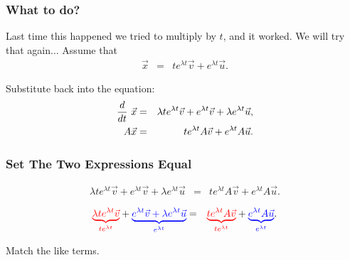 \begin{frame}
  \frametitle{What to do?}

  Last time this happened we tried to multiply by $t$, and it
  worked. We will try that again...
  Assume that
  \begin{eqnarray*}
    \vec{x} & = & t e^{\lambda t} \vec{v} + e^{\lambda t} \vec{u}.
  \end{eqnarray*}

  {
    Substitute back into the equation:
    \begin{eqnarray*}
      \deriv{~}{t} \vec{x} & = & \lambda t e^{\lambda t} \vec{v} + e^{\lambda t} \vec{v} 
         + \lambda e^{\lambda t} \vec{u}, \\
      A\vec{x} & = & t e^{\lambda t} A \vec{v} + e^{\lambda t} A \vec{u}.
    \end{eqnarray*}
  }
  
\end{frame}


\begin{frame}
  \frametitle{Set The Two Expressions Equal}

  {
    \begin{eqnarray*}
      \lambda t e^{\lambda t} \vec{v} + e^{\lambda t} \vec{v} + \lambda e^{\lambda t} \vec{u}
      & = & 
      t e^{\lambda t} A \vec{v} + e^{\lambda t} A \vec{u}.
    \end{eqnarray*}
  }

  {
    \begin{eqnarray*}
      \redText{\underbrace{\lambda t e^{\lambda t} \vec{v}}_ {te^{\lambda t}}} +  
      \blueText{\underbrace{e^{\lambda t} \vec{v} + \lambda e^{\lambda t} \vec{u}}_{e^{\lambda t}}}
      & = & 
      \redText{\underbrace{t e^{\lambda t} A \vec{v}}_{t e^{\lambda t}}} + 
      \blueText{\underbrace{e^{\lambda t} A \vec{u}}_{e^{\lambda t}}}.
    \end{eqnarray*}

    Match the like terms.

  }
  

\end{frame}

